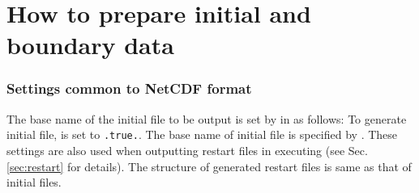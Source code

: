 \section{How to prepare initial and boundary data} \label{sec:adv_datainput}

\subsubsection{Settings common to NetCDF format} \label{sec:datainput_common_setting}
The base name of the initial file to be output is set by  in  as follows:
To generate initial file,  is set to \verb|.true.|.
The base name of initial file is specified by .
These settings are also used when outputting restart files in executing \scaledg (see Sec. \ref{sec:restart} for details).
The structure of generated restart files is same as that of initial files.
